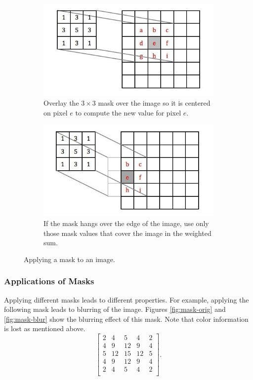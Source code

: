 \documentclass[addpoints]{exam}
\begin{document}
\begin{figure}
  \centering
  \begin{subfigure}{.48\textwidth}
    \includegraphics[width=\textwidth]{mask1}
    \caption{Overlay the $3 \times 3$ mask over the image so it is centered on pixel $e$ to compute the new value for pixel $e$.}\label{fig:mask-full}
  \end{subfigure}
  \begin{subfigure}[c]{.48\textwidth}
    \includegraphics[width=\textwidth]{mask2}
    \caption{If the mask hangs over the edge of the image, use only those mask values that cover the image in the weighted sum.}\label{fig:mask-hang}
  \end{subfigure}
  \caption{Applying a mask to an image.}
  \label{fig:mask}
\end{figure}

\subsubsection{Applications of Masks}

Applying different masks leads to different properties. For example, applying the following mask leads to blurring of the image. Figures \ref{fig:mask-orig} and \ref{fig:mask-blur} show the blurring effect of this mask. Note that color information is lost as mentioned above.
\[
  \left[
    \begin{array}{ccccc}
      2 & 4  & 5  & 4  & 2 \\
      4 & 9  & 12 & 9  & 4 \\
      5 & 12 & 15 & 12 & 5 \\
      4 & 9  & 12 & 9  & 4 \\
      2 & 4  & 5  & 4  & 2 \\
    \end{array}
    \right].
\]
\end{document}
